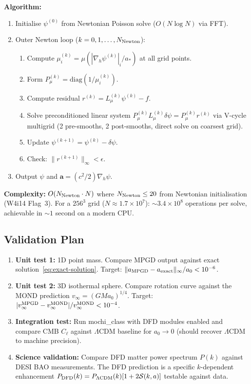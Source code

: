 \documentclass[11pt]{article}
\theoremstyle{definition}
\theoremstyle{remark}
\begin{document}
\textbf{Algorithm:}
\begin{enumerate}
\item Initialise $\psi^{(0)}$ from Newtonian Poisson solve ($O(N \log N)$
  via FFT).
\item Outer Newton loop ($k = 0, 1, \ldots, N_{\rm Newton}$):
  \begin{enumerate}
  \item Compute $\mu_i^{(k)} = \mu(|\nabla_h \psi^{(k)}|_i / a_*)$ at
    all grid points.
  \item Form $P_\mu^{(k)} = \text{diag}(1/\mu_i^{(k)})$.
  \item Compute residual $r^{(k)} = L_\mu^{(k)} \psi^{(k)} - f$.
  \item Solve preconditioned linear system $P_\mu^{(k)} L_\mu^{(k)}
    \delta\psi = P_\mu^{(k)} r^{(k)}$ via V-cycle multigrid
    (2 pre-smooths, 2 post-smooths, direct solve on coarsest grid).
  \item Update $\psi^{(k+1)} = \psi^{(k)} - \delta\psi$.
  \item Check: $\|r^{(k+1)}\|_\infty < \epsilon$.
  \end{enumerate}
\item Output $\psi$ and $\mathbf{a} = (c^2/2)\nabla_h \psi$.
\end{enumerate}

\textbf{Complexity:} $O(N_{\rm Newton} \cdot N)$ where $N_{\rm Newton}
\leq 20$ from Newtonian initialisation (W4i14 Flag~3). For a $256^3$
grid ($N \approx 1.7 \times 10^7$): $\sim 3.4 \times 10^8$ operations
per solve, achievable in $\sim 1$ second on a modern CPU.

\subsection{Validation Plan}
\label{sec:validation}

\begin{enumerate}
\item \textbf{Unit test 1:} 1D point mass. Compare MPGD output against
  exact solution~\eqref{eq:exact-solution}. Target: $\|a_{\rm MPGD} -
  a_{\rm exact}\|_\infty / a_0 < 10^{-6}$.
\item \textbf{Unit test 2:} 3D isothermal sphere. Compare rotation curve
  against the MOND prediction $v_\infty = (GMa_0)^{1/4}$. Target:
  $|v_\infty^{\rm MPGD} - v_\infty^{\rm MOND}| / v_\infty^{\rm MOND}
  < 10^{-4}$.
\item \textbf{Integration test:} Run mochi\_class with DFD modules
  enabled and compare CMB $C_\ell$ against $\Lambda$CDM baseline for
  $a_0 \to 0$ (should recover $\Lambda$CDM to machine precision).
\item \textbf{Science validation:} Compare DFD matter power spectrum
  $P(k)$ against DESI BAO measurements. The DFD prediction is a specific
  $k$-dependent enhancement $P_{\rm DFD}(k) = P_{\Lambda\rm CDM}(k)
  [1 + 2\mathcal{S}(k, a)]$ testable against data.
\end{enumerate}
\end{document}
